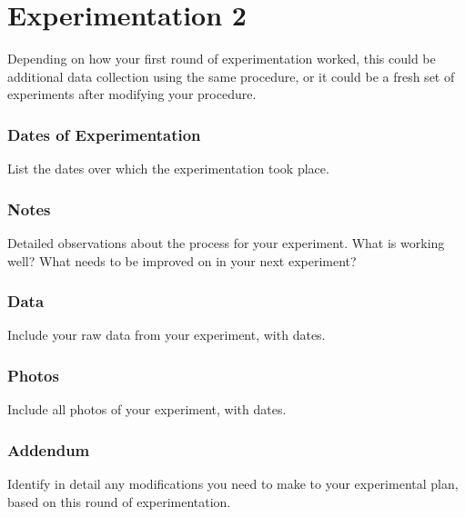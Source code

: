 \part{Experimentation 2}

Depending on how your first round of experimentation worked, this could be
additional data collection using the same procedure, or it could be a fresh set
of experiments after modifying your procedure.

\section*{Dates of Experimentation}

List the dates over which the experimentation took place.

\begin{field}

\end{field}

\section{Notes}

Detailed observations about the process for your experiment. What is working
well? What needs to be improved on in your next experiment?

\begin{field}

\end{field}

\section{Data}

Include your raw data from your experiment, with dates.

\section*{Photos}

Include all photos of your experiment, with dates.

\section{Addendum}

Identify in detail any modifications you need to make to your experimental plan,
based on this round of experimentation.

\begin{field}

\end{field}